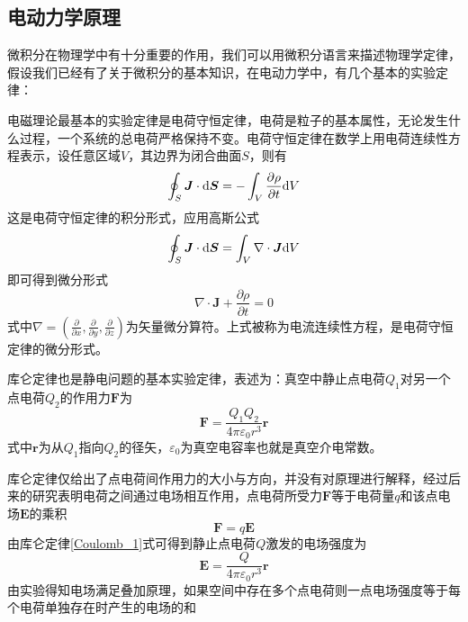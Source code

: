 \documentclass[UTF8,a4paper,10pt]{ctexart}
\begin{document}
\begin{multicols}{2}
        \subsection{电动力学原理}
        微积分在物理学中有十分重要的作用，我们可以用微积分语言来描述物理学定律，假设我们已经有了关于微积分的基本知识，在电动力学中，有几个基本的实验定律：\par
        电磁理论最基本的实验定律是电荷守恒定律，电荷是粒子的基本属性，无论发生什么过程，一个系统的总电荷严格保持不变。电荷守恒定律在数学上用电荷连续性方程表示，设任意区域$V$，其边界为闭合曲面$S$，则有
        \begin{equation}
            \oint_S\bm{J}\cdot {\rm d}\bm{S} = -\int_V\frac{\partial\rho}{\partial t}{\rm d}V
        \end{equation}
        这是电荷守恒定律的积分形式，应用高斯公式
        \begin{equation*}
            \oint_S\bm{J}\cdot {\rm d}\bm{S} = \int_V\nabla\cdot\bm{J}{\rm d}V
        \end{equation*}
        即可得到微分形式
        \begin{equation}\label{continuity equation}
            \nabla\cdot\bm{J} + \frac{\partial\rho}{\partial t}= 0
        \end{equation}
        式中$\nabla = (\frac{\partial}{\partial x},\frac{\partial}{\partial y},\frac{\partial}{\partial z})$为矢量微分算符。上式被称为电流连续性方程，是电荷守恒定律的微分形式。\par
        库仑定律也是静电问题的基本实验定律，表述为：真空中静止点电荷$Q_1$对另一个点电荷$Q_2$的作用力$\bm{F}$为
        \begin{equation}\label{Coulomb_1}
            \bm{F} = \frac{Q_1Q_2}{4\pi\varepsilon_0r^3}\bm{r}
        \end{equation}
        式中$\bm{r}$为从$Q_1$指向$Q_2$的径矢，$\varepsilon_0$为真空电容率也就是真空介电常数。\par
        库仑定律仅给出了点电荷间作用力的大小与方向，并没有对原理进行解释，经过后来的研究表明电荷之间通过电场相互作用，点电荷所受力$\bm{F}$等于电荷量$q$和该点电场$\bm{E}$的乘积
        \begin{equation}
            \bm{F} = q\bm{E}
        \end{equation}
        由库仑定律\eqref{Coulomb_1}式可得到静止点电荷$Q$激发的电场强度为
        \begin{equation}
            \bm{E} = \frac{Q}{4\pi\varepsilon_0r^3}\bm{r}
        \end{equation}
        由实验得知电场满足叠加原理，如果空间中存在多个点电荷则一点电场强度等于每个电荷单独存在时产生的电场的和

\end{multicols}
\end{document}
